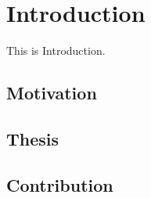 \chapter{Introduction}
This is Introduction.
\section{Motivation}
\section{Thesis}
\section{Contribution}